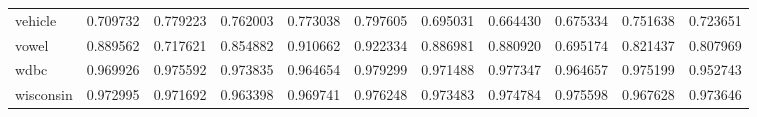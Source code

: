 \begin{tabular}{lrrrrrrrrrr}
vehicle         &   0.709732 &  0.779223 &  0.762003 &  0.773038 &  0.797605 &  0.695031 &  0.664430 &  0.675334 &  0.751638 &  0.723651 \\
vowel           &   0.889562 &  0.717621 &  0.854882 &  0.910662 &  0.922334 &  0.886981 &  0.880920 &  0.695174 &  0.821437 &  0.807969 \\
wdbc            &   0.969926 &  0.975592 &  0.973835 &  0.964654 &  0.979299 &  0.971488 &  0.977347 &  0.964657 &  0.975199 &  0.952743 \\
wisconsin       &   0.972995 &  0.971692 &  0.963398 &  0.969741 &  0.976248 &  0.973483 &  0.974784 &  0.975598 &  0.967628 &  0.973646 \\
\bottomrule
\end{tabular}
